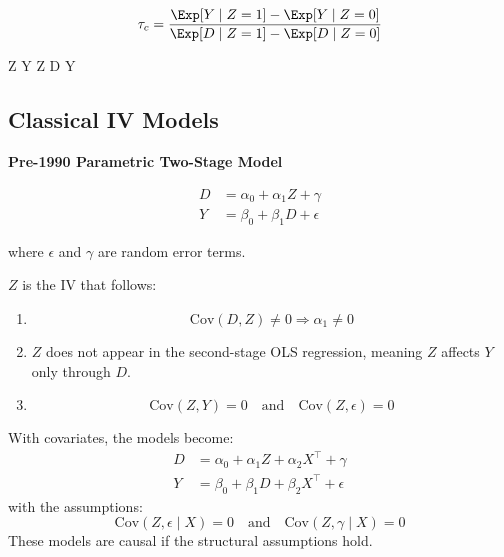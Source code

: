 \[
\tau_c = \frac{\Exp[Y \mid Z = 1] - \Exp[Y \mid Z = 0]}{\Exp[D \mid Z = 1] - \Exp[D \mid Z = 0]}
\]


 Z \to Y \quad {} \quad Z \to D \to Y

\subsection{Classical IV Models}

\textbf{Pre-1990 Parametric Two-Stage Model}

\begin{align*}
    D &= \alpha_0 + \alpha_1 Z + \gamma \tag{A} \\
    Y &= \beta_0 + \beta_1 D + \epsilon \tag{A}
\end{align*}

where \(\epsilon\) and \(\gamma\) are random error terms.

\(Z\) is the IV that follows:
\begin{enumerate}
    \item {} 
    \[
    \text{Cov}(D, Z) \neq 0 \Rightarrow \alpha_1 \neq 0
    \]
    \item {} \(Z\) does not appear in the second-stage OLS regression, meaning \(Z\) affects \(Y\) only through \(D\).

    \item {} 
    \[
    \text{Cov}(Z, Y) = 0 \quad \text{and} \quad \text{Cov}(Z, \epsilon) = 0
    \]
\end{enumerate}

With covariates, the models become:
\begin{align*}
    D &= \alpha_0 + \alpha_1 Z + \alpha_2 X^\top + \gamma \\
    Y &= \beta_0 + \beta_1 D + \beta_2 X^\top + \epsilon
\end{align*}
with the assumptions:
\[
\text{Cov}(Z, \epsilon \mid X) = 0 \quad \text{and} \quad \text{Cov}(Z, \gamma \mid X) = 0
\]
These models are causal if the structural assumptions hold.

